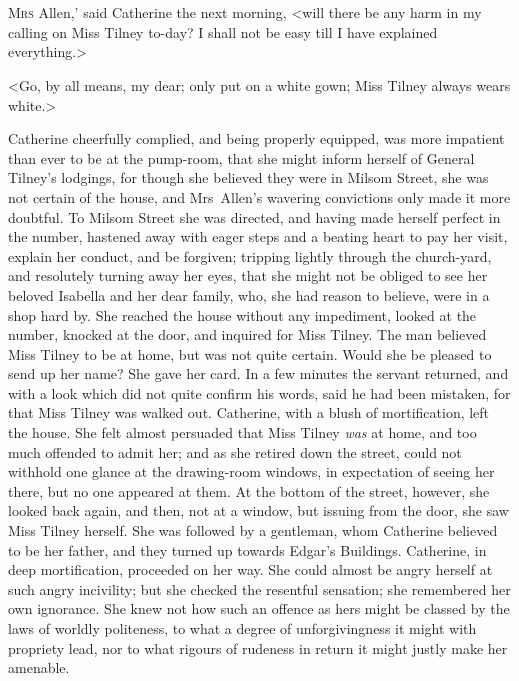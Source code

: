 \chapter[Chapter \thechapter]{} 
	
	\lettrine[ante=`]{M}{rs} Allen,' said Catherine the next morning, <will there be any harm in my calling on Miss Tilney to-day? I shall not be easy till I have explained everything.> 

\zz
 <Go, by all means, my dear; only put on a white gown; Miss Tilney always wears white.> 

 Catherine cheerfully complied, and being properly equipped, was more impatient than ever to be at the pump-room, that she might inform herself of General Tilney's lodgings, for though she believed they were in Milsom Street, she was not certain of the house, and Mrs~Allen's wavering convictions only made it more doubtful. To Milsom Street she was directed, and having made herself perfect in the number, hastened away with eager steps and a beating heart to pay her visit, explain her conduct, and be forgiven; tripping lightly through the church-yard, and resolutely turning away her eyes, that she might not be obliged to see her beloved Isabella and her dear family, who, she had reason to believe, were in a shop hard by. She reached the house without any impediment, looked at the number, knocked at the door, and inquired for Miss Tilney. The man believed Miss Tilney to be at home, but was not quite certain. Would she be pleased to send up her name? She gave her card. In a few minutes the servant returned, and with a look which did not quite confirm his words, said he had been mistaken, for that Miss Tilney was walked out. Catherine, with a blush of mortification, left the house. She felt almost persuaded that Miss Tilney \textit{was} at home, and too much offended to admit her; and as she retired down the street, could not withhold one glance at the drawing-room windows, in expectation of seeing her there, but no one appeared at them. At the bottom of the street, however, she looked back again, and then, not at a window, but issuing from the door, she saw Miss Tilney herself. She was followed by a gentleman, whom Catherine believed to be her father, and they turned up towards Edgar's Buildings. Catherine, in deep mortification, proceeded on her way. She could almost be angry herself at such angry incivility; but she checked the resentful sensation; she remembered her own ignorance. She knew not how such an offence as hers might be classed by the laws of worldly politeness, to what a degree of unforgivingness it might with propriety lead, nor to what rigours of rudeness in return it might justly make her amenable. 

